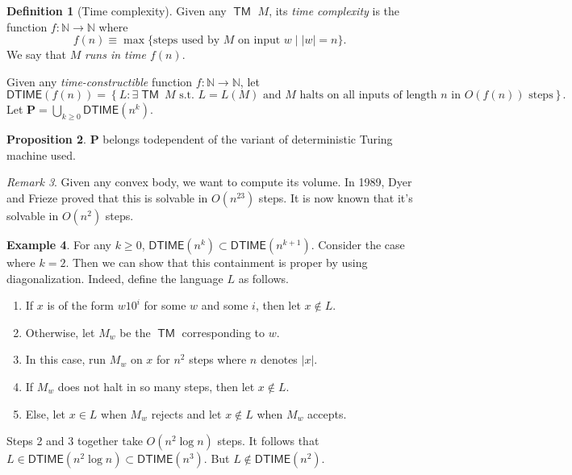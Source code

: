 \documentclass[10pt,letterpaper,cm]{nupset}
\theoremstyle{definition}
\newtheorem{definition}{Definition}[subsection]
\newtheorem{exmp}[definition]{Example}
\theoremstyle{theorem}
\newtheorem{prop}[definition]{Proposition}
\theoremstyle{remark}
\newtheorem{remark}[definition]{Remark}
\newcommand{\N}{\mathbb N}
\newcommand{\1}{\mathbf{1}}
\newcommand{\0}{\vec 0}
\DeclareMathOperator{\TM}{\mathsf{TM}}
\begin{document}
\smallskip

\begin{definition}[Time complexity]
Given any $\TM$ $M$, its \textit{time complexity} is the function $f: \N \to \N$ where $$f(n) \equiv\max\{\text{steps used by }M \text{ on input }w\mid \left\lvert{w}\right\rvert =n\}.$$ We say that $M$ \textit{runs in time $f(n)$}.
\end{definition}

\smallskip

 Given any \textit{time-constructible} function $f: \N \to \N$, let $$\mathsf{DTIME}(f(n)) = \left\{ L : \exists \TM \ M  \text{ s.t. } L = L(M) \text{ and }M \text{ halts on all inputs of length }n \text{ in }O(f(n)) \text{ steps}\right\}.$$
Let $\mathbf{P} = \bigcup_{k\geq 0} \mathsf{DTIME}(n^k)$.


\begin{prop}
$\mathbf{P}$ belongs todependent of the variant of deterministic Turing machine used. 
\end{prop}

\begin{remark}
Given any convex body, we want to compute its volume. In 1989, Dyer and Frieze proved that this is solvable in $O(n^{23})$ steps. It is now known that it's solvable in $O(n^2)$ steps. 
\end{remark}

\begin{exmp}
For any $k\geq 0$, $\mathsf{DTIME}(n^k) \subset \mathsf{DTIME}(n^{k+1})$. Consider the case where $k=2$. Then we can show that this containment  is proper by using diagonalization. Indeed, define the language $L$ as follows. 
\begin{enumerate}
\item If $x$ is of the form $w10^i$ for some $w$ and some $i$, then let $x\notin L$.
\item Otherwise, let $M_w$ be the $\TM$ corresponding to $w$. 
\item In this case, run $M_w$ on $x$ for $n^2$ steps where $n$ denotes $\left\lvert{x}\right\rvert$. 
\item  If $M_w$ does not halt in so many steps, then let $x\notin L$. 
\item Else, let $x\in L$ when $M_w$ rejects and let $x\notin L$ when $M_w$ accepts. 
\end{enumerate}
Steps 2 and 3 together take $O(n^2 \log{n})$ steps. It follows that $L \in \mathsf{DTIME}(n^2\log{n})\subset \mathsf{DTIME}(n^3)$. But $L \notin \mathsf{DTIME}(n^2)$.
\end{exmp}
\end{document}
